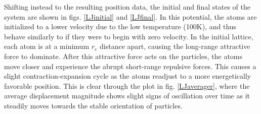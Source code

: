 \documentclass[12pt]{article}
\begin{document}
Shifting instead to the resulting position data, the initial and final states of the system are shown in figs. \ref{LJinitial} and \ref{LJfinal}.  In this potential, the atoms are initialized to a lower velocity due to the low temperature (100K), and thus behave similarly to if they were to begin with zero velocity.  In the initial lattice, each atom is at a minimum $r_e$ distance apart, causing the long-range attractive force to dominate.  After this attractive force acts on the particles, the atoms move closer and experience the abrupt short-range repulsive forces.  This causes a slight contraction-expansion cycle as the atoms readjust to a more energetically favorable position.  This is clear through the plot in fig. \ref{LJaverager}, where the average displacement magnitude shows slight signs of oscillation over time as it steadily moves towards the stable orientation of particles.
\end{document}
